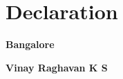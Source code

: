 \documentclass[11pt,a4paper,sans]{moderncv}
\begin{document}
\section{Declaration}

\begin{minipage}{0.5\textwidth}
\begin{flushleft}
  \large
\bfseries Bangalore
\end{flushleft}
\end{minipage}
\begin{minipage}{0.5\textwidth}

\begin{flushright}
  \large
\bfseries Vinay Raghavan \textsc{K S}
\end{flushright}
\end{minipage}

\end{document}
